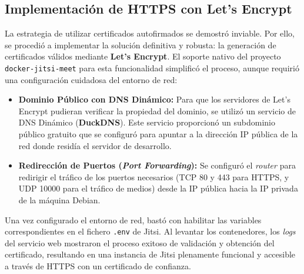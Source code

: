 \subsection{Implementación de HTTPS con Let's Encrypt}
La estrategia de utilizar certificados autofirmados se demostró inviable. Por ello, se procedió a implementar la solución definitiva y robusta: la generación de certificados válidos mediante \textbf{Let's Encrypt}. El soporte nativo del proyecto \texttt{docker-jitsi-meet} para esta funcionalidad simplificó el proceso, aunque requirió una configuración cuidadosa del entorno de red:

\begin{itemize}
    \item \textbf{Dominio Público con DNS Dinámico:} Para que los servidores de Let's Encrypt pudieran verificar la propiedad del dominio, se utilizó un servicio de DNS Dinámico (\textbf{DuckDNS}). Este servicio proporcionó un subdominio público gratuito que se configuró para apuntar a la dirección IP pública de la red donde residía el servidor de desarrollo.
    
    \item \textbf{Redirección de Puertos (\textit{Port Forwarding}):} Se configuró el \textit{router} para redirigir el tráfico de los puertos necesarios (TCP 80 y 443 para HTTPS, y UDP 10000 para el tráfico de medios) desde la IP pública hacia la IP privada de la máquina Debian.
\end{itemize}

Una vez configurado el entorno de red, bastó con habilitar las variables correspondientes en el fichero \texttt{.env} de Jitsi. Al levantar los contenedores, los \textit{logs} del servicio web mostraron el proceso exitoso de validación y obtención del certificado, resultando en una instancia de Jitsi plenamente funcional y accesible a través de HTTPS con un certificado de confianza.

